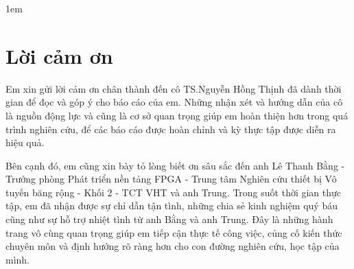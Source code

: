 \documentclass[13pt]{report}
\begin{document}
\thispagestyle{empty}
\fboxsep1em
\setlength{\baselineskip}{18truept}
\noindent{}


\chapter*{Lời cảm ơn}
\large

Em xin gửi lời cảm ơn chân thành đến cô TS.Nguyễn Hồng Thịnh đã dành thời gian để đọc và góp ý cho báo cáo của em. Những nhận xét và hướng dẫn của cô là nguồn động lực và cũng là cơ sở quan trọng giúp em hoàn thiện hơn trong quá trình nghiên cứu, để các báo cáo được hoàn chỉnh và kỳ thực tập được diễn ra hiệu quả.

Bên cạnh đó, em cũng xin bày tỏ lòng biết ơn sâu sắc đến anh Lê Thanh Bằng - Trưởng phòng Phát triển nền tảng FPGA -
Trung tâm Nghiên cứu thiết bị Vô tuyến băng rộng - Khối 2 - TCT VHT và anh Trung. Trong suốt thời gian thực tập, em đã nhận được sự chỉ dẫn tận tình, những chia sẻ kinh nghiệm quý báu cũng như sự hỗ trợ nhiệt tình từ anh Bằng và anh Trung. Đây là những hành trang vô cùng quan trọng giúp em tiếp cận thực tế công việc, củng cố kiến thức chuyên môn và định hướng rõ ràng hơn cho con đường nghiên cứu, học tập của mình.
\end{document}
